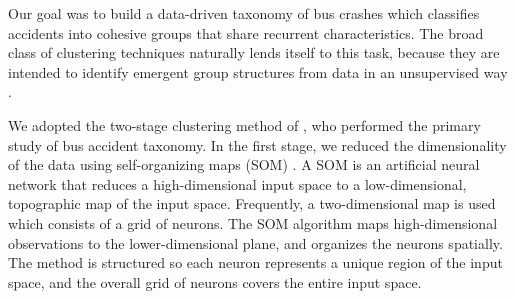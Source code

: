 Our goal was to build a data-driven taxonomy of bus crashes which classifies accidents into cohesive groups that share recurrent characteristics. The broad class of clustering techniques naturally lends itself to this task, because they are intended to identify emergent group structures from data in an unsupervised way \citep{friedman:elements}.

We adopted the two-stage clustering method of \citet{prato2013bus}, who performed the primary study of bus accident taxonomy. In the first stage, we reduced the dimensionality of the data using self-organizing maps (SOM) \citep{kohonen1982}. A SOM is an artificial neural network that reduces a high-dimensional input space to a low-dimensional, topographic map of the input space. Frequently, a two-dimensional map is used which consists of a grid of neurons. The SOM algorithm maps high-dimensional observations to the lower-dimensional plane, and organizes the neurons spatially. The method is structured so each neuron represents a unique region of the input space, and the overall grid of neurons covers the entire input space.



